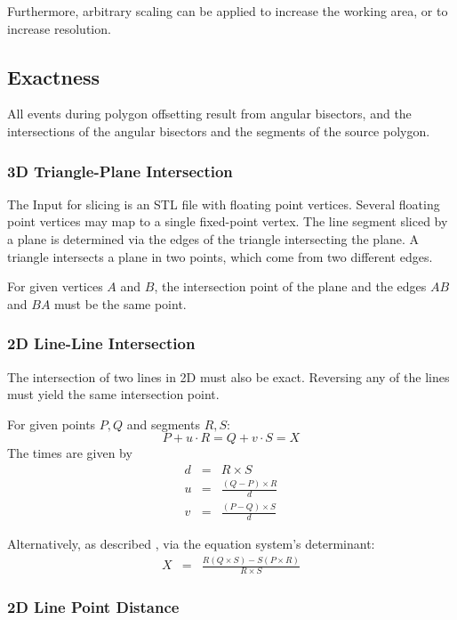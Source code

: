 \documentclass[12pt,a4paper,oneside,openany]{article}
\begin{document}
Furthermore, arbitrary scaling can be applied to increase the working area, or to increase resolution.

\subsection{Exactness}

All events during polygon offsetting result from angular bisectors, and the intersections of the angular bisectors and the segments of the source polygon.

\subsubsection{3D Triangle-Plane Intersection}

The Input for slicing is an STL file with floating point vertices. Several floating point vertices may map to a single fixed-point vertex. The line segment sliced by a plane is determined via the edges of the triangle intersecting the plane. A triangle intersects a plane in two points, which come from two different edges.

For given vertices $A$ and $B$, the intersection point of the plane and the edges $AB$ and $BA$ must be the same point.

\subsubsection{2D Line-Line Intersection}

The intersection of two lines in 2D must also be exact. Reversing any of the lines must yield the same intersection point.

For given points $P,Q$ and segments $R,S$: $$ P + u\cdot R = Q + v \cdot S = X$$
The times are given by
\begin{eqnarray*}
d &=& R \times S \\
u &=& \frac{(Q-P) \times R}{d} \\
v &=& \frac{(P-Q) \times S}{d}
\end{eqnarray*}

Alternatively, as described \cite{mw:lli}, via the equation system's determinant:
\begin{eqnarray*}
X &=& \frac{R (Q \times S )  - S (P \times R )}{R \times S}
\end{eqnarray*}


\subsubsection{2D Line Point Distance}
\end{document}
